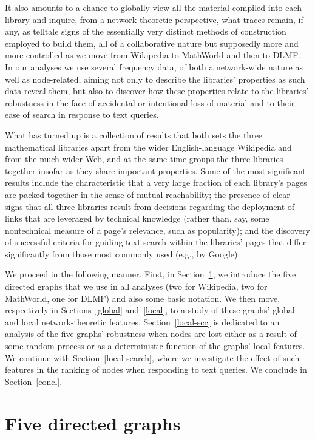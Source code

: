 \documentclass{article}
\begin{document}
It also amounts to a chance to globally view all the material compiled into each
library and inquire, from a network-theoretic perspective, what traces remain,
if any, as telltale signs of the essentially very distinct methods of
construction employed to build them, all of a collaborative nature but
supposedly more and more controlled as we move from Wikipedia to MathWorld and
then to DLMF. In our analyses we use several frequency data, of both a
network-wide nature as well as node-related, aiming not only to describe the
libraries' properties as such data reveal them, but also to discover how these
properties relate to the libraries' robustness in the face of accidental or
intentional loss of material and to their ease of search in response to text
queries.

What has turned up is a collection of results that both sets the three
mathematical libraries apart from the wider English-language Wikipedia and from
the much wider Web, and at the same time groups the three libraries together
insofar as they share important properties. Some of the most significant
results include the characteristic that a very large fraction of each library's
pages are packed together in the sense of mutual reachability; the presence of
clear signs that all three libraries result from decisions regarding the
deployment of links that are leveraged by technical knowledge (rather than, say,
some nontechnical measure of a page's relevance, such as popularity); and the
discovery of successful criteria for guiding text search within the libraries'
pages that differ significantly from those most commonly used (e.g., by Google).

We proceed in the following manner. First, in Section~\ref{graphs}, we introduce
the five directed graphs that we use in all analyses (two for Wikipedia, two for
MathWorld, one for DLMF) and also some basic notation. We then move,
respectively in Sections~\ref{global} and~\ref{local}, to a study of these
graphs' global and local network-theoretic features. Section~\ref{local-scc} is
dedicated to an analysis of the five graphs' robustness when nodes are lost
either as a result of some random process or as a deterministic function of the
graphs' local features. We continue with Section~\ref{local-search}, where we
investigate the effect of such features in the ranking of nodes when responding
to text queries. We conclude in Section~\ref{concl}.

\section{Five directed graphs}\label{graphs}
\end{document}
